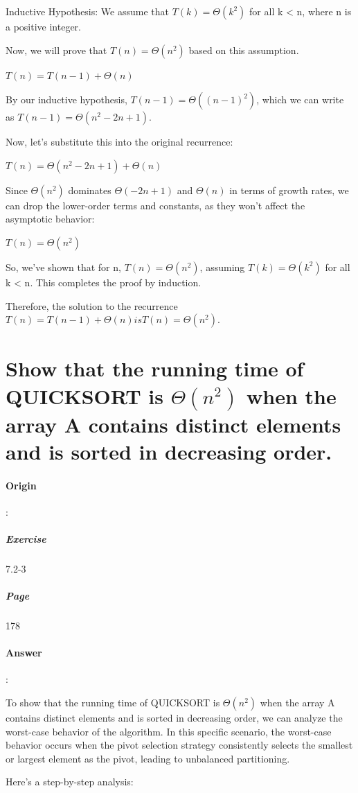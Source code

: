\documentclass{article}
\begin{document}
Inductive Hypothesis: We assume that $T(k) = \Theta(k^2)$ for all k < n, where n is a positive integer.

Now, we will prove that $T(n) = \Theta(n^2)$ based on this assumption.

$T(n) = T(n - 1) + \Theta(n)$

By our inductive hypothesis, $T(n - 1) = \Theta((n - 1)^2)$, which we can write as $T(n - 1) = \Theta(n^2 - 2n + 1)$.

Now, let's substitute this into the original recurrence:

$T(n) = \Theta(n^2 - 2n + 1) + \Theta(n)$

Since $\Theta(n^2)$ dominates $\Theta(-2n + 1)$ and $\Theta(n)$ in terms of growth rates, we can drop the lower-order terms and constants, as they won't affect the asymptotic behavior:

$T(n) = \Theta(n^2)$

So, we've shown that for n, $T(n) = \Theta(n^2)$, assuming $T(k) = \Theta(k^2)$ for all k < n. This completes the proof by induction.

Therefore, the solution to the recurrence $T(n) = T(n - 1) + \Theta(n) is T(n) = \Theta(n^2)$.

  \section{Show that the running time of QUICKSORT is $\Theta(n ^ 2)$ when the array A contains distinct elements and is sorted in decreasing order.}
  \paragraph{Origin}:
    \subparagraph{Exercise}7.2-3
    \subparagraph{Page}178
  \paragraph{Answer}:
  
To show that the running time of QUICKSORT is $\Theta(n^2)$ when the array A contains distinct elements and is sorted in decreasing order, we can analyze the worst-case behavior of the algorithm. In this specific scenario, the worst-case behavior occurs when the pivot selection strategy consistently selects the smallest or largest element as the pivot, leading to unbalanced partitioning.

Here's a step-by-step analysis:
\end{document}
